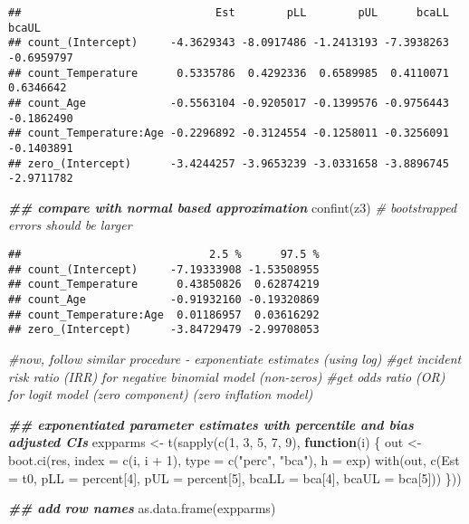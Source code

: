 \documentclass[
]{article}
\newenvironment{Shaded}{\begin{snugshade}}{\end{snugshade}}
\newcommand{\AttributeTok}[1]{\textcolor[rgb]{0.77,0.63,0.00}{#1}}
\newcommand{\CommentTok}[1]{\textcolor[rgb]{0.56,0.35,0.01}{\textit{#1}}}
\newcommand{\ControlFlowTok}[1]{\textcolor[rgb]{0.13,0.29,0.53}{\textbf{#1}}}
\newcommand{\DecValTok}[1]{\textcolor[rgb]{0.00,0.00,0.81}{#1}}
\newcommand{\DocumentationTok}[1]{\textcolor[rgb]{0.56,0.35,0.01}{\textbf{\textit{#1}}}}
\newcommand{\FunctionTok}[1]{\textcolor[rgb]{0.00,0.00,0.00}{#1}}
\newcommand{\NormalTok}[1]{#1}
\newcommand{\OtherTok}[1]{\textcolor[rgb]{0.56,0.35,0.01}{#1}}
\newcommand{\SpecialCharTok}[1]{\textcolor[rgb]{0.00,0.00,0.00}{#1}}
\newcommand{\StringTok}[1]{\textcolor[rgb]{0.31,0.60,0.02}{#1}}
\begin{document}
\begin{verbatim}
##                              Est        pLL        pUL      bcaLL      bcaUL
## count_(Intercept)     -4.3629343 -8.0917486 -1.2413193 -7.3938263 -0.6959797
## count_Temperature      0.5335786  0.4292336  0.6589985  0.4110071  0.6346642
## count_Age             -0.5563104 -0.9205017 -0.1399576 -0.9756443 -0.1862490
## count_Temperature:Age -0.2296892 -0.3124554 -0.1258011 -0.3256091 -0.1403891
## zero_(Intercept)      -3.4244257 -3.9653239 -3.0331658 -3.8896745 -2.9711782
\end{verbatim}

\begin{Shaded}
\begin{Highlighting}[]
\DocumentationTok{\#\# compare with normal based approximation}
\FunctionTok{confint}\NormalTok{(z3) }\CommentTok{\# bootstrapped errors should be larger}
\end{Highlighting}
\end{Shaded}

\begin{verbatim}
##                             2.5 %      97.5 %
## count_(Intercept)     -7.19333908 -1.53508955
## count_Temperature      0.43850826  0.62874219
## count_Age             -0.91932160 -0.19320869
## count_Temperature:Age  0.01186957  0.03616292
## zero_(Intercept)      -3.84729479 -2.99708053
\end{verbatim}

\begin{Shaded}
\begin{Highlighting}[]
\CommentTok{\#now, follow similar procedure {-} exponentiate estimates (using log)}
\CommentTok{\#get incident risk ratio (IRR) for negative binomial model (non{-}zeros)}
\CommentTok{\#get odds ratio (OR) for logit model (zero component) (zero inflation model)}

\DocumentationTok{\#\# exponentiated parameter estimates with percentile and bias adjusted CIs}
\NormalTok{expparms }\OtherTok{\textless{}{-}} \FunctionTok{t}\NormalTok{(}\FunctionTok{sapply}\NormalTok{(}\FunctionTok{c}\NormalTok{(}\DecValTok{1}\NormalTok{, }\DecValTok{3}\NormalTok{, }\DecValTok{5}\NormalTok{, }\DecValTok{7}\NormalTok{, }\DecValTok{9}\NormalTok{), }\ControlFlowTok{function}\NormalTok{(i) \{}
\NormalTok{  out }\OtherTok{\textless{}{-}} \FunctionTok{boot.ci}\NormalTok{(res, }\AttributeTok{index =} \FunctionTok{c}\NormalTok{(i, i }\SpecialCharTok{+} \DecValTok{1}\NormalTok{), }\AttributeTok{type =} \FunctionTok{c}\NormalTok{(}\StringTok{"perc"}\NormalTok{, }\StringTok{"bca"}\NormalTok{), }\AttributeTok{h =}\NormalTok{ exp)}
  \FunctionTok{with}\NormalTok{(out, }\FunctionTok{c}\NormalTok{(}\AttributeTok{Est =}\NormalTok{ t0, }\AttributeTok{pLL =}\NormalTok{ percent[}\DecValTok{4}\NormalTok{], }\AttributeTok{pUL =}\NormalTok{ percent[}\DecValTok{5}\NormalTok{],}
              \AttributeTok{bcaLL =}\NormalTok{ bca[}\DecValTok{4}\NormalTok{], }\AttributeTok{bcaUL =}\NormalTok{ bca[}\DecValTok{5}\NormalTok{]))}
\NormalTok{\}))}


\DocumentationTok{\#\# add row names}
\FunctionTok{as.data.frame}\NormalTok{(expparms)}
\end{Highlighting}
\end{Shaded}
\end{document}
